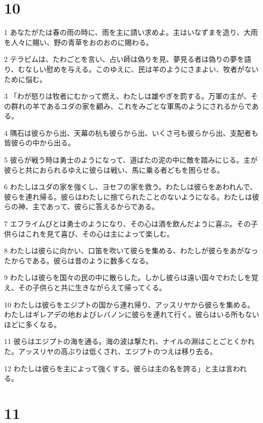 \chapter{10}

\par 1 あなたがたは春の雨の時に、雨を主に請い求めよ。主はいなずまを造り、大雨を人々に賜い、野の青草をおのおのに賜わる。
\par 2 テラピムは、たわごとを言い、占い師は偽りを見、夢見る者は偽りの夢を語り、むなしい慰めを与える。このゆえに、民は羊のようにさまよい、牧者がないために悩む。
\par 3 「わが怒りは牧者にむかって燃え、わたしは雄やぎを罰する。万軍の主が、その群れの羊であるユダの家を顧み、これをみごとな軍馬のようにされるからである。
\par 4 隅石は彼らから出、天幕の杭も彼らから出、いくさ弓も彼らから出、支配者も皆彼らの中から出る。
\par 5 彼らが戦う時は勇士のようになって、道ばたの泥の中に敵を踏みにじる。主が彼らと共におられるゆえに彼らは戦い、馬に乗る者どもを困らせる。
\par 6 わたしはユダの家を強くし、ヨセフの家を救う。わたしは彼らをあわれんで、彼らを連れ帰る。彼らはわたしに捨てられたことのないようになる。わたしは彼らの神、主であって、彼らに答えるからである。
\par 7 エフライムびとは勇士のようになり、その心は酒を飲んだように喜ぶ。その子供らはこれを見て喜び、その心は主によって楽しむ。
\par 8 わたしは彼らに向かい、口笛を吹いて彼らを集める、わたしが彼らをあがなったからである。彼らは昔のように数多くなる。
\par 9 わたしは彼らを国々の民の中に散らした。しかし彼らは遠い国々でわたしを覚え、その子供らと共に生きながらえて帰ってくる。
\par 10 わたしは彼らをエジプトの国から連れ帰り、アッスリヤから彼らを集める。わたしはギレアデの地およびレバノンに彼らを連れて行く。彼らはいる所もないほどに多くなる。
\par 11 彼らはエジプトの海を通る。海の波は撃たれ、ナイルの淵はことごとくかれた。アッスリヤの高ぶりは低くされ、エジプトのつえは移り去る。
\par 12 わたしは彼らを主によって強くする。彼らは主の名を誇る」と主は言われる。

\chapter{11}

